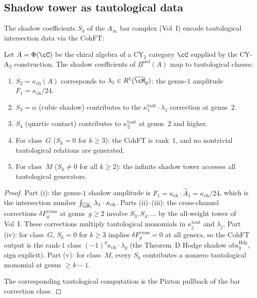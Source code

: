 \subsection{Shadow tower as tautological data}

The shadow coefficients $S_k$ of the $A_\infty$ bar complex (Vol~I) encode tautological intersection data via the CohFT:

\begin{proposition}
\label{prop:shadow-taut-dictionary}
Let $A = \Phi(\cC)$ be the chiral algebra of a CY$_2$ category $\cC$ supplied by the CY-A$_2$ construction. The shadow coefficients of $B^{\mathrm{ord}}(A)$ map to tautological classes:
\begin{enumerate}[label=(\roman*)]
 \item $S_2 = \kappa_{\mathrm{ch}}(A)$ corresponds to $\lambda_1 \in R^1(\overline{\cM}_{g})$: the genus-$1$ amplitude $F_1 = \kappa_{\mathrm{ch}}/24$.
 \item $S_3 = \alpha$ (cubic shadow) contributes to the $\kappa_1^{\mathrm{taut}} \cdot \lambda_1$ correction at genus~$2$.
 \item $S_4$ (quartic contact) contributes to $\kappa_2^{\mathrm{taut}}$ at genus~$2$ and higher.
 \item For class~$G$ ($S_k = 0$ for $k \geq 3$): the CohFT is rank~$1$, and no nontrivial tautological relations are generated.
 \item For class~$M$ ($S_k \neq 0$ for all $k \geq 2$): the infinite shadow tower accesses all tautological generators.
\end{enumerate}
\end{proposition}

\begin{proof}
Part (i): the genus-$1$ shadow amplitude is $F_1 = \kappa_{\mathrm{ch}} \cdot \hat{A}_1 = \kappa_{\mathrm{ch}}/24$, which is the intersection number $\int_{\overline{\cM}_1} \lambda_1 \cdot \kappa_{\mathrm{ch}}$. Parts (ii)--(iii): the cross-channel corrections $\delta F_g^{\mathrm{cross}}$ at genus~$g \geq 2$ involve $S_3, S_4, \ldots$ by the all-weight tower of Vol~I. These corrections multiply tautological monomials in $\kappa_j^{\mathrm{taut}}$ and $\lambda_j$. Part (iv): for class~$G$, $S_k = 0$ for $k \geq 3$ implies $\delta F_g^{\mathrm{cross}} = 0$ at all genera, so the CohFT output is the rank-$1$ class $(-1)^g\kappa_{\mathrm{ch}} \cdot \lambda_g$ (the Theorem~D Hodge shadow $\mathrm{obs}_g^{\mathrm{Hdg}}$, sign explicit). Part (v): for class~$M$, every $S_k$ contributes a nonzero tautological monomial at genus $\geq k - 1$.

The corresponding tautological computation is the Pixton pullback of the bar correction class.
\end{proof}

